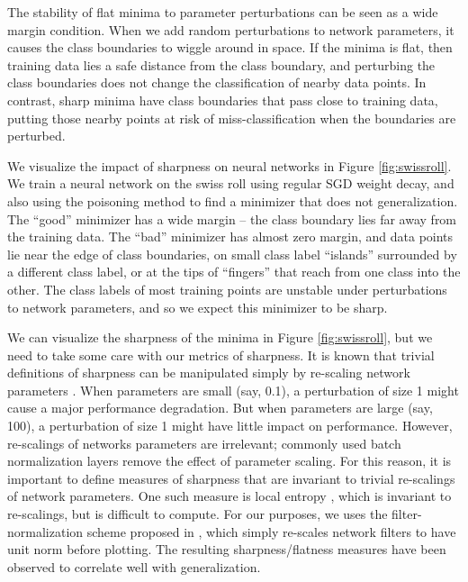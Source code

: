 \documentclass{article}
\begin{document}
    The stability of flat minima to parameter perturbations can be seen as a wide margin condition.  When we add random perturbations to network parameters, it causes the class boundaries to wiggle around in space.  If the minima is flat, then training data lies a safe distance from the class boundary, and perturbing the class boundaries does not change the classification of nearby data points.  In contrast, sharp minima have class boundaries that pass close to training data, putting those nearby points at risk of miss-classification when the boundaries are perturbed.


        We visualize the impact of sharpness on neural networks in Figure \ref{fig:swissroll}.  We train a neural network on the swiss roll using regular SGD weight decay, and also using the poisoning method to find a minimizer that does not generalization.  The ``good'' minimizer has a wide margin -- the class boundary lies far away from the training data.  The ``bad'' minimizer has almost zero margin, and data points lie near the edge of class boundaries, on small class label ``islands'' surrounded by a different class label, or at the tips of ``fingers'' that reach from one class into the other.  The class labels of most training points are unstable under perturbations to network parameters, and so we expect this minimizer to be sharp.


       We can visualize the sharpness of the minima in Figure \ref{fig:swissroll}, but we need to take some care with our metrics of sharpness.  It is known that trivial definitions of sharpness can be manipulated simply by re-scaling network parameters \cite{dinh2017sharp}. When parameters are small (say, 0.1), a perturbation of size 1 might cause a major performance degradation.  But when parameters are large (say, 100), a perturbation of size 1 might have little impact on performance.  However, re-scalings of networks parameters are irrelevant;  commonly used batch normalization layers remove the effect of parameter scaling.  For this reason, it is important to define measures of sharpness that are invariant to trivial re-scalings of network parameters.   One such measure is local entropy \citep{chaudhari2017entropy}, which is invariant to re-scalings, but is difficult to compute. For our purposes, we uses the filter-normalization scheme proposed in \cite{li2018landscape}, which simply re-scales network filters to have unit norm before plotting.  The resulting sharpness/flatness measures have been observed to correlate well with generalization.
\end{document}
